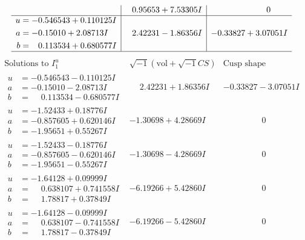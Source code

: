\documentclass[1p]{elsarticle_modified}
\theoremstyle{definition}
\newcommand{\I}{\sqrt{-1}}
\begin{document}
$$\begin{array}{c|c|c}
 & \phantom{-}0.95653 + 7.53305 I & \phantom{-0.000000 } 0 \\ \hline\begin{aligned}
u &= -0.546543 + 0.110125 I \\
a &= -0.15010 + 2.08713 I \\
b &= \phantom{-}0.113534 + 0.680577 I\end{aligned}
 & \phantom{-}2.42231 - 1.86356 I & -0.33827 + 3.07051 I\\
 \hline 
 \end{array}$$\newpage$$\begin{array}{c|c|c}  
\text{Solutions to }I^u_{1}& \I (\text{vol} + \sqrt{-1}CS) & \text{Cusp shape}\\
 \hline 
\begin{aligned}
u &= -0.546543 - 0.110125 I \\
a &= -0.15010 - 2.08713 I \\
b &= \phantom{-}0.113534 - 0.680577 I\end{aligned}
 & \phantom{-}2.42231 + 1.86356 I & -0.33827 - 3.07051 I \\ \hline\begin{aligned}
u &= -1.52433 + 0.18776 I \\
a &= -0.857605 + 0.620146 I \\
b &= -1.95651 + 0.55267 I\end{aligned}
 & -1.30698 + 4.28669 I & \phantom{-0.000000 } 0 \\ \hline\begin{aligned}
u &= -1.52433 - 0.18776 I \\
a &= -0.857605 - 0.620146 I \\
b &= -1.95651 - 0.55267 I\end{aligned}
 & -1.30698 - 4.28669 I & \phantom{-0.000000 } 0 \\ \hline\begin{aligned}
u &= -1.64128 + 0.09999 I \\
a &= \phantom{-}0.638107 + 0.741558 I \\
b &= \phantom{-}1.78817 + 0.37849 I\end{aligned}
 & -6.19266 + 5.42860 I & \phantom{-0.000000 } 0 \\ \hline\begin{aligned}
u &= -1.64128 - 0.09999 I \\
a &= \phantom{-}0.638107 - 0.741558 I \\
b &= \phantom{-}1.78817 - 0.37849 I\end{aligned}
 & -6.19266 - 5.42860 I & \phantom{-0.000000 } 0 \\ \hline\begin{aligned}

\end{aligned}
\end{array}$$
\end{document}
